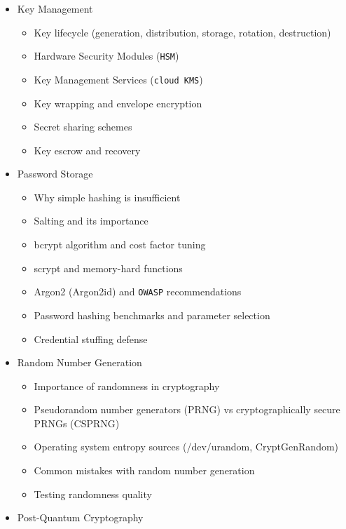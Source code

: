 \documentclass[
]{article}
\providecommand{\tightlist}{%
  \setlength{\itemsep}{0pt}\setlength{\parskip}{0pt}}
\begin{document}
\begin{itemize}
  \begin{itemize}
  \tightlist
  \item
    Public Key Infrastructure concepts
  \item
    \texttt{X.509} certificate structure and fields
  \item
    Certificate Authorities (\texttt{CA}) and trust chains
  \item
    Certificate signing requests (CSR)
  \item
    Certificate revocation (CRL, \texttt{OCSP})
  \item
    \texttt{Let\textquotesingle{}s\ Encrypt} and automated certificate
    management
  \item
    Certificate pinning and its trade-offs
  \end{itemize}
\item
  Key Management

  \begin{itemize}
  \tightlist
  \item
    Key lifecycle (generation, distribution, storage, rotation,
    destruction)
  \item
    Hardware Security Modules (\texttt{HSM})
  \item
    Key Management Services (\texttt{cloud\ KMS})
  \item
    Key wrapping and envelope encryption
  \item
    Secret sharing schemes
  \item
    Key escrow and recovery
  \end{itemize}
\item
  Password Storage

  \begin{itemize}
  \tightlist
  \item
    Why simple hashing is insufficient
  \item
    Salting and its importance
  \item
    bcrypt algorithm and cost factor tuning
  \item
    scrypt and memory-hard functions
  \item
    Argon2 (Argon2id) and \texttt{OWASP} recommendations
  \item
    Password hashing benchmarks and parameter selection
  \item
    Credential stuffing defense
  \end{itemize}
\item
  Random Number Generation

  \begin{itemize}
  \tightlist
  \item
    Importance of randomness in cryptography
  \item
    Pseudorandom number generators (PRNG) vs cryptographically secure
    PRNGs (CSPRNG)
  \item
    Operating system entropy sources (/dev/urandom, CryptGenRandom)
  \item
    Common mistakes with random number generation
  \item
    Testing randomness quality
  \end{itemize}
\item
  Post-Quantum Cryptography


\end{itemize}
\end{document}
